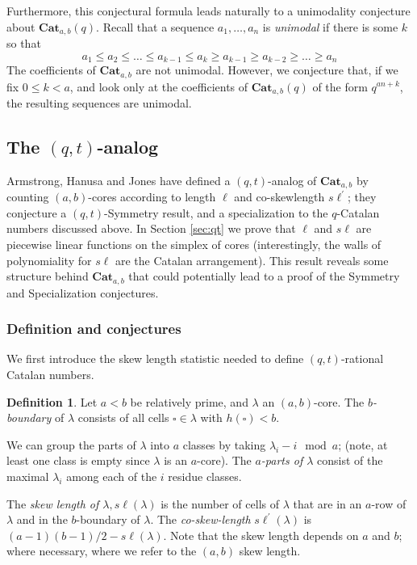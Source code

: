 \documentclass{amsart}[12pt]
\theoremstyle{definition}
\newtheorem{definition}[dummy]{Definition}
\newcommand{\Cat}{\mathbf{Cat}}
\newcommand{\sk}{s\ell}
\begin{document}
Furthermore, this conjectural formula leads naturally to a unimodality conjecture about $\Cat_{a,b}(q)$.  Recall that a sequence $a_1,\dots, a_n$ is \emph{unimodal} if there is some $k$ so that $$a_1\leq a_2\leq \dots \leq a_{k-1}\leq a_k \geq a_{k-1} \geq a_{k-2}\geq\dots\geq a_n$$
The coefficients of $\Cat_{a,b}$ are not unimodal.  However, we conjecture that, if we fix $0
\leq k <a$, and look only at the coefficients of $\Cat_{a,b}(q)$ of the form $q^{an+k}$, the resulting sequences are unimodal.

\subsection{The \texorpdfstring{$(q,t)$}{(q,t)}-analog}

Armstrong, Hanusa and Jones \cite{AHJ} have defined a $(q,t)$-analog of $\Cat_{a,b}$ by counting $(a,b)$-cores according to length $\ell$ and co-skewlength $\sk^\prime$; they conjecture a $(q,t)$-Symmetry result, and a specialization to the $q$-Catalan numbers discussed above.  In Section \ref{sec:qt} we prove that $\ell$ and $\sk$ are piecewise linear functions on the simplex of cores (interestingly, the walls of polynomiality for $\sk$ are the Catalan arrangement).  This result reveals some structure behind $\Cat_{a,b}$ that could potentially lead to a proof of the Symmetry and Specialization conjectures.


\subsubsection{Definition and conjectures}




We first introduce the skew length statistic needed to define $(q,t)$-rational Catalan numbers.
\begin{definition}
Let $a<b$ be relatively prime, and $\lambda$ an $(a,b)$-core.  The                  \emph{$b$-boundary} of $\lambda$ consists of all cells $\square\in\lambda$ with $h(\square)<b$.

We can group the parts of $\lambda$ into $a$ classes by taking $\lambda_i-i\mod a$; (note, at least one class is empty since $\lambda$ is an $a$-core).  The \emph{$a$-parts of $\lambda$} consist of the maximal $\lambda_i$ among each of the $i$ residue classes.

The \emph{skew length of $\lambda, \sk(\lambda)$} is the number of cells of $\lambda$ that are in an $a$-row of $\lambda$ and in the $b$-boundary of $\lambda$. The \emph{co-skew-length} $\sk^\prime(\lambda)$ is $(a-1)(b-1)/2-\sk(\lambda)$.  Note that the skew length depends on $a$ and $b$; where necessary, where we refer to the $(a,b)$ skew length.

\end{definition}
\end{document}
